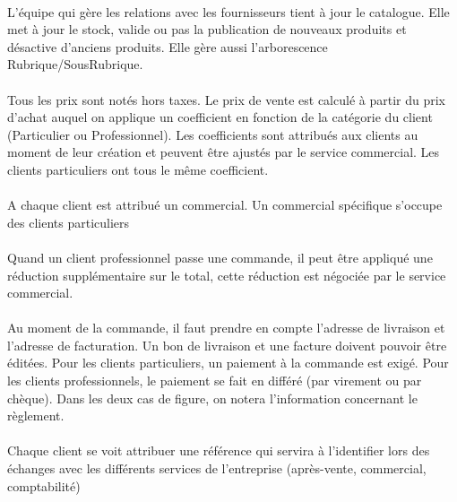 \documentclass{article}
\begin{document}
\paragraph{}
L'équipe qui gère les relations avec les fournisseurs tient à jour le catalogue. Elle met à jour le stock, valide ou pas la publication de nouveaux produits et désactive d'anciens produits. Elle gère aussi l'arborescence Rubrique/SousRubrique.
\par
\paragraph{}
Tous les prix sont notés hors taxes. Le prix de vente est calculé à partir du prix d'achat auquel on applique un coefficient en fonction de la catégorie du client (Particulier ou Professionnel). Les coefficients sont attribués aux clients au moment de leur création et peuvent être ajustés par le service commercial. Les clients particuliers ont tous le même coefficient.
\par
\paragraph{}
A chaque client est attribué un commercial. Un commercial spécifique s'occupe des clients particuliers
\par
\paragraph{}
Quand un client professionnel passe une commande, il peut être appliqué une réduction supplémentaire sur le total, cette réduction est négociée par le service commercial.
\par
\paragraph{}
Au moment de la commande, il faut prendre en compte l'adresse de livraison et l'adresse de facturation. Un bon de livraison et une facture doivent pouvoir être éditées. Pour les clients particuliers, un paiement à la commande est exigé. Pour les clients professionnels, le paiement se fait en différé (par virement ou par chèque). Dans les deux cas de figure, on notera l'information concernant le règlement.
\par
\paragraph{}
Chaque client se voit attribuer une référence qui servira à l'identifier lors des échanges avec les différents services de l'entreprise (après-vente, commercial, comptabilité)
\par
\end{document}
